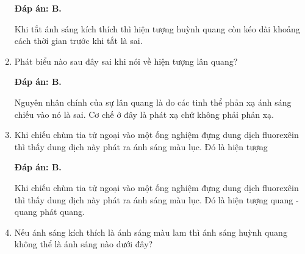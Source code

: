 \begin{enumerate}[label=\bfseries Câu \arabic*:]
	\loigiai
	{		\textbf{Đáp án: B.}
		
Khi tắt ánh sáng kích thích thì hiện tượng huỳnh quang còn kéo dài khoảng cách thời gian trước khi tắt là sai.
		
	}
	
	\item {} 
	
	\cauhoi
	{Phát biểu nào sau đây sai khi nói về hiện tượng lân quang?
	}
	
	\loigiai
	{		\textbf{Đáp án: B.}
		
Nguyên nhân chính của sự lân quang là do các tinh thể phản xạ ánh sáng chiếu vào nó là sai. Cơ chế ở đây là phát xạ chứ không phải phản xạ.
		
	}
	
	\item {} 
	
	\cauhoi
	{Khi chiếu chùm tia tử ngoại vào một ống nghiệm đựng dung dịch fluorexêin thì thấy dung dịch này phát ra ánh sáng màu lục. Đó là hiện tượng
	}
	
	\loigiai
	{		\textbf{Đáp án: B.}
		
Khi chiếu chùm tia tử ngoại vào một ống nghiệm đựng dung dịch fluorexêin thì thấy dung dịch này phát ra ánh sáng màu lục. Đó là hiện tượng quang - quang phát quang.
		
	}
	
\item {} 
	
	\cauhoi
	{Nếu ánh sáng kích thích là ánh sáng màu lam thì ánh sáng huỳnh quang không thể là ánh sáng nào dưới đây?
	}
	

\end{enumerate}
